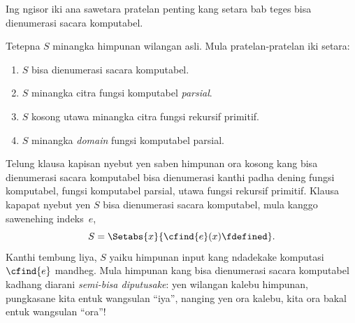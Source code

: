\documentclass[../../../include/open-logic-section]{subfiles}
\begin{document}



Ing ngisor iki ana sawetara pratelan penting
kang setara bab teges bisa dienumerasi sacara
komputabel.

\begin{thm}
Tetepna $S$ minangka himpunan wilangan asli.
Mula pratelan-pratelan iki setara:
\begin{enumerate}
\item{} $S$ bisa dienumerasi sacara komputabel.
\item{} $S$ minangka citra fungsi komputabel \emph{parsial}.
\item{} $S$ kosong utawa minangka citra fungsi rekursif primitif.
\item{} $S$ minangka \emph{domain} fungsi komputabel parsial.
\end{enumerate}
\end{thm}

\begin{explain}
Telung klausa kapisan nyebut yen saben himpunan
ora kosong kang bisa dienumerasi sacara
komputabel bisa dienumerasi kanthi padha dening fungsi
komputabel, fungsi komputabel parsial, utawa
fungsi rekursif primitif. Klausa kapapat
nyebut yen $S$ bisa dienumerasi sacara
komputabel, mula kanggo sawenehing indeks~$e$,
\[
S = \Setabs{x}{\cfind{e}(x) \fdefined}.
\]
Kanthi tembung liya, $S$ yaiku himpunan
input kang ndadekake komputasi $\cfind{e}$
mandheg. Mula himpunan kang bisa dienumerasi
sacara komputabel kadhang diarani
\emph{semi-bisa diputusake}: yen wilangan kalebu
himpunan, pungkasane kita entuk wangsulan
``iya'', nanging yen ora kalebu, kita ora
bakal entuk wangsulan ``ora''!{}
\end{explain}
\end{document}

